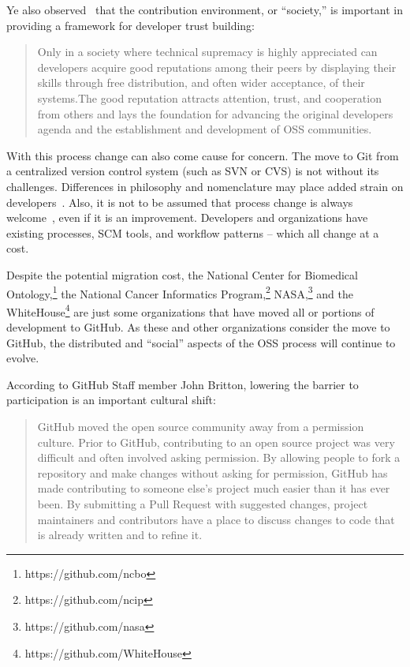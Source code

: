 \documentclass{proc}
\begin{document}
{{{{{Ye also observed~\cite{ye2003toward} that the contribution environment, or ``society,'' is important in providing a framework for developer trust building:
\begin{quote}
Only in a society where technical supremacy is highly appreciated can developers acquire good reputations among their peers by displaying their skills through free distribution, and often wider acceptance, of their systems.The good reputation attracts attention, trust, and cooperation from others and lays the foundation for advancing the original developers agenda and the establishment and development of OSS communities. 
\end{quote}

With this process change can also come cause for concern. The move to Git from a centralized version control system (such as SVN or CVS) is not without its challenges. Differences in philosophy and nomenclature may place added strain on developers~\cite{bird2009promises}. Also, it is not to be assumed that process change is always welcome~\cite{de2009software}, even if it is an improvement. Developers and organizations have existing processes, SCM tools, and workflow patterns -- which all change at a cost.

Despite the potential migration cost, the National Center for Biomedical Ontology,\footnote{https://github.com/ncbo} the National Cancer Informatics Program,\footnote{https://github.com/ncip} NASA,\footnote{https://github.com/nasa} and the WhiteHouse\footnote{https://github.com/WhiteHouse} are just some organizations that have moved all or portions of development to GitHub. As these and other organizations consider the move to GitHub, the distributed and ``social'' aspects of the OSS process will continue to evolve.

According to GitHub Staff member John Britton, lowering the barrier to participation is an important cultural shift:
\begin{quote}
GitHub moved the open source community away from a permission culture. Prior to GitHub, contributing to an open source project was very difficult and often involved asking permission. By allowing people to fork a repository and make changes without asking for permission, GitHub has made contributing to someone else's project much easier than it has ever been. By submitting a Pull Request with suggested changes, project maintainers and contributors have a place to discuss changes to code that is already written and to refine it.~\cite{github_interview}
\end{quote}

}}}}}
\end{document}
